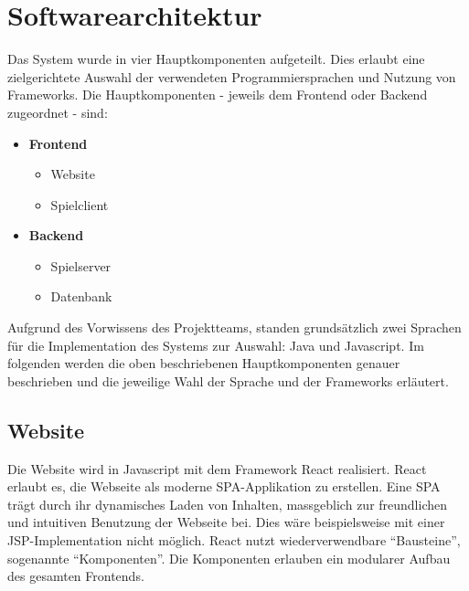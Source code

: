 \documentclass[11pt,ngerman]{article}
\newcommand{\quotes}[1]{``#1''}
\begin{document}
    \section{Softwarearchitektur}
        Das System wurde in vier Hauptkomponenten aufgeteilt. Dies erlaubt eine zielgerichtete Auswahl der verwendeten Programmiersprachen und Nutzung von Frameworks. Die Hauptkomponenten - jeweils dem Frontend oder Backend zugeordnet - sind:
        \begin{multicols}{2}
            \begin{itemize}
                \item \textbf{Frontend}
                \begin{itemize}
                    \item Website
                    \item Spielclient
                \end{itemize}
                \item \textbf{Backend}
                \begin{itemize}
                    \item Spielserver
                    \item Datenbank
                \end{itemize}
            \end{itemize}
        \end{multicols}

        \noindent Aufgrund des Vorwissens des Projektteams, standen grundsätzlich zwei Sprachen für die Implementation des Systems zur Auswahl: Java und Javascript. Im folgenden werden die oben beschriebenen Hauptkomponenten genauer beschrieben und die jeweilige Wahl der Sprache und der Frameworks erläutert.

        \subsection{Website}
        Die Website wird in Javascript mit dem Framework \Gls{React} realisiert. \Gls{React} erlaubt es, die Webseite als moderne \Gls{SPA}-Applikation zu erstellen. Eine \Gls{SPA} trägt durch ihr dynamisches Laden von Inhalten, massgeblich zur freundlichen und intuitiven Benutzung der Webseite bei. Dies wäre beispielsweise mit einer \Gls{JSP}-Implementation nicht möglich. \Gls{React} nutzt wiederverwendbare  \quotes{Bausteine}, sogenannte \quotes{Komponenten}. Die Komponenten erlauben ein modularer Aufbau des gesamten Frontends.
\end{document}
